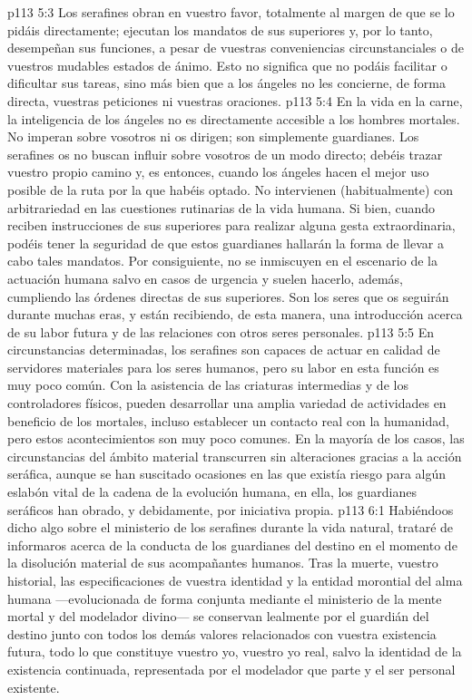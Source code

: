 \vs p113 5:3 Los serafines obran en vuestro favor, totalmente al margen de que se lo pidáis directamente; ejecutan los mandatos de sus superiores y, por lo tanto, desempeñan sus funciones, a pesar de vuestras conveniencias circunstanciales o de vuestros mudables estados de ánimo. Esto no significa que no podáis facilitar o dificultar sus tareas, sino más bien que a los ángeles no les concierne, de forma directa, vuestras peticiones ni vuestras oraciones.
\vs p113 5:4 En la vida en la carne, la inteligencia de los ángeles no es directamente accesible a los hombres mortales. No imperan sobre vosotros ni os dirigen; son simplemente guardianes. Los serafines os  no buscan influir sobre vosotros de un modo directo; debéis trazar vuestro propio camino y, es entonces, cuando los ángeles hacen el mejor uso posible de la ruta por la que habéis optado. No intervienen (habitualmente) con arbitrariedad en las cuestiones rutinarias de la vida humana. Si bien, cuando reciben instrucciones de sus superiores para realizar alguna gesta extraordinaria, podéis tener la seguridad de que estos guardianes hallarán la forma de llevar a cabo tales mandatos. Por consiguiente, no se inmiscuyen en el escenario de la actuación humana salvo en casos de urgencia y suelen hacerlo, además, cumpliendo las órdenes directas de sus superiores. Son los seres que os seguirán durante muchas eras, y están recibiendo, de esta manera, una introducción acerca de su labor futura y de las relaciones con otros seres personales.
\vs p113 5:5 \pc En circunstancias determinadas, los serafines son capaces de actuar en calidad de servidores materiales para los seres humanos, pero su labor en esta función es muy poco común. Con la asistencia de las criaturas intermedias y de los controladores físicos, pueden desarrollar una amplia variedad de actividades en beneficio de los mortales, incluso establecer un contacto real con la humanidad, pero estos acontecimientos son muy poco comunes. En la mayoría de los casos, las circunstancias del ámbito material transcurren sin alteraciones gracias a la acción seráfica, aunque se han suscitado ocasiones en las que existía riesgo para algún eslabón vital de la cadena de la evolución humana, en ella, los guardianes seráficos han obrado, y debidamente, por iniciativa propia.
\vs p113 6:1 Habiéndoos dicho algo sobre el ministerio de los serafines durante la vida natural, trataré de informaros acerca de la conducta de los guardianes del destino en el momento de la disolución material de sus acompañantes humanos. Tras la muerte, vuestro historial, las especificaciones de vuestra identidad y la entidad morontial del alma humana ---evolucionada de forma conjunta mediante el ministerio de la mente mortal y del modelador divino--- se conservan lealmente por el guardián del destino junto con todos los demás valores relacionados con vuestra existencia futura, todo lo que constituye vuestro yo, vuestro yo real, salvo la identidad de la existencia continuada, representada por el modelador que parte y el ser personal existente.
